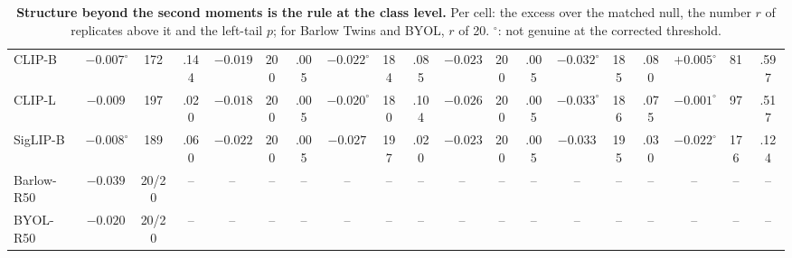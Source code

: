 \begin{table}[H]
\begin{tabular}{lcccccccccccccccccc}
\midrule
CLIP-B & $-0.007^{\circ}$ & 172 & .144 & $-0.019$ & 200 & .005 & $-0.022^{\circ}$ & 184 & .085 & $-0.023$ & 200 & .005 & $-0.032^{\circ}$ & 185 & .080 & $+0.005^{\circ}$ & 81 & .597 \\
CLIP-L & $-0.009$ & 197 & .020 & $-0.018$ & 200 & .005 & $-0.020^{\circ}$ & 180 & .104 & $-0.026$ & 200 & .005 & $-0.033^{\circ}$ & 186 & .075 & $-0.001^{\circ}$ & 97 & .517 \\
SigLIP-B & $-0.008^{\circ}$ & 189 & .060 & $-0.022$ & 200 & .005 & $-0.027$ & 197 & .020 & $-0.023$ & 200 & .005 & $-0.033$ & 195 & .030 & $-0.022^{\circ}$ & 176 & .124 \\
Barlow-R50 & $-0.039$ & 20/20 & -- & -- & -- & -- & -- & -- & -- & -- & -- & -- & -- & -- & -- & -- & -- & -- \\
BYOL-R50 & $-0.020$ & 20/20 & -- & -- & -- & -- & -- & -- & -- & -- & -- & -- & -- & -- & -- & -- & -- & -- \\
\bottomrule
\end{tabular}
\par\vspace{2pt}
\caption{\textbf{Structure beyond the second moments is the rule at the class level.} Per cell: the excess over the matched null, the number $r$ of replicates above it and the left-tail $p$; for Barlow Twins and BYOL, $r$ of 20. $^{\circ}$: not genuine at the corrected threshold.
}
\label{tab:q1-census}\label{tab:census}
\end{table}
